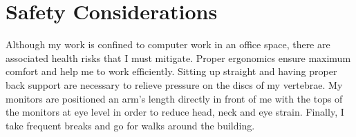 \documentclass{article}
\begin{document}
  \section{Safety Considerations}\label{section:safety}
  
  Although my work is confined to computer work in an office space, there are 
  associated health risks that I must mitigate. Proper ergonomics ensure 
  maximum comfort and help me to work efficiently. Sitting up straight and
  having proper back support are necessary to relieve pressure on the discs
  of my vertebrae. My monitors are positioned an arm's length directly in 
  front of me with the tops of the monitors at eye level in order to reduce
  head, neck and eye strain. Finally, I take frequent breaks and go for 
  walks around the building.

  \newpage
  
  
\end{document}
